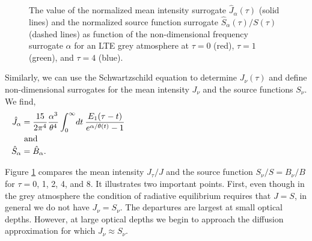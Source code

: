 \begin{figure}
\footnotesize
{}
\caption{The value of the normalized mean intensity surrogate $\hat J_\alpha(\tau)$ (solid lines) and
the normalized source function surrogate $\hat S_\alpha(\tau)/S(\tau)$ (dashed lines)  as  function of the non-dimensional frequency surrogate $\alpha$ for an
LTE grey atmosphere at $\tau = 0$ (red), $\tau = 1$ (green), and $\tau = 4$ (blue).}
\label{figure-grey-heating-and-cooling}
\end{figure}

Similarly, we can use the Schwartzschild equation to determine $J_\nu(\tau)$ and define non-dimensional surrogates for the mean intensity $J_\nu$ and the source functions $S_\nu$. We find,
\begin{align}
\hat J_\alpha 
&= \frac{15}{2\pi^4} \frac{\alpha^3}{\theta^4}
\int_0^{\infty}\!dt\:  
\frac{E_1(\tau - t)}{e^{\alpha/\theta(t)} - 1}\\
\noalign{and}
\hat S_\alpha &= \hat B_\alpha.
\end{align}


Figure \ref{figure-grey-heating-and-cooling} compares the mean intensity
$J_\tau/J$ and the source function $S_\nu/S = B_\nu/B$ for $\tau = 0$,
1, 2, 4, and 8. It illustrates two important points. First, even though
in the grey atmosphere the condition of radiative equilibrium requires
that $J = S$, in general we do not have $J_\nu = S_\nu$. The departures
are largest at small optical depths. However, at large optical depths we
begin to approach the diffusion approximation for which $J_\nu
\approx S_\nu$.

\newslide

